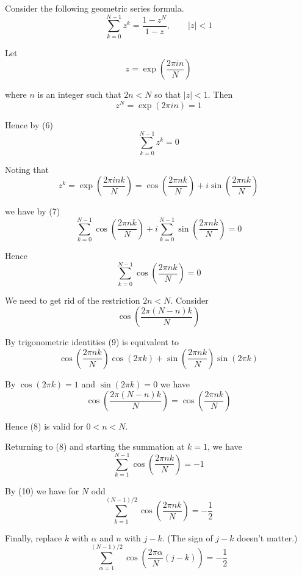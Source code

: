 \documentclass[12pt]{article}
\begin{document}
Consider the following geometric series formula.
\begin{equation*}
\sum_{k=0}^{N-1}z^k=\frac{1-z^N}{1-z},\qquad|z|<1
\tag{6}
\end{equation*}

Let
\begin{equation*}
z=\exp\left(\frac{2\pi in}{N}\right)
\end{equation*}

where $n$ is an integer such that $2n<N$ so that $|z|<1$.
Then
\begin{equation*}
z^N=\exp(2\pi in)=1
\end{equation*}

Hence by (6)
\begin{equation*}
\sum_{k=0}^{N-1}z^k=0
\tag{7}
\end{equation*}

Noting that
\begin{equation*}
z^k=\exp\left(\frac{2\pi ink}{N}\right)=\cos\left(\frac{2\pi nk}{N}\right)+i\sin\left(\frac{2\pi nk}{N}\right)
\end{equation*}

we have by (7)
\begin{equation*}
\sum_{k=0}^{N-1}\cos\left(\frac{2\pi nk}{N}\right)+i\sum_{k=0}^{N-1}\sin\left(\frac{2\pi nk}{N}\right)=0
\end{equation*}

Hence
\begin{equation*}
\sum_{k=0}^{N-1}\cos\left(\frac{2\pi nk}{N}\right)=0
\tag{8}
\end{equation*}

We need to get rid of the restriction $2n<N$.
Consider
\begin{equation*}
\cos\left(\frac{2\pi(N-n)k}{N}\right)
\tag{9}
\end{equation*}

By trigonometric identities (9) is equivalent to
\begin{equation*}
\cos\left(\frac{2\pi nk}{N}\right)\cos(2\pi k)
+\sin\left(\frac{2\pi nk}{N}\right)\sin(2\pi k)
\end{equation*}

By $\cos(2\pi k)=1$ and $\sin(2\pi k)=0$ we have
\begin{equation*}
\cos\left(\frac{2\pi(N-n)k}{N}\right)=\cos\left(\frac{2\pi nk}{N}\right)
\tag{10}
\end{equation*}

Hence (8) is valid for $0<n<N$.

\bigskip
Returning to (8) and starting the summation at $k=1$, we have
\begin{equation*}
\sum_{k=1}^{N-1}\cos\left(\frac{2\pi nk}{N}\right)=-1
\end{equation*}

By (10) we have for $N$ odd
\begin{equation*}
\sum_{k=1}^{(N-1)/2}\cos\left(\frac{2\pi nk}{N}\right)=-\frac{1}{2}
\end{equation*}

Finally, replace $k$ with $\alpha$ and $n$ with $j-k$.
(The sign of $j-k$ doesn't matter.)
\begin{equation*}
\sum_{\alpha=1}^{(N-1)/2}\cos\left(\frac{2\pi\alpha}{N}(j-k)\right)=-\frac{1}{2}
\end{equation*}
\end{document}
